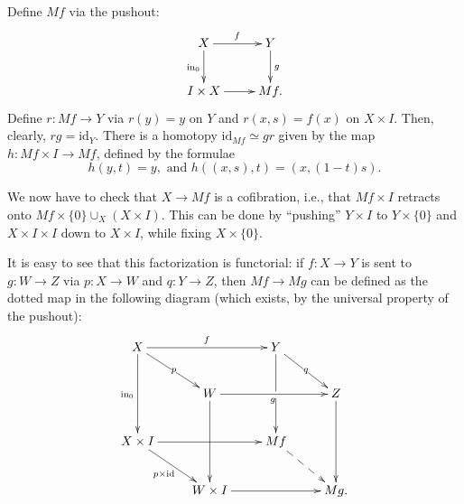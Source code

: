 \begin{solution}
    Define $Mf$ via the pushout:
    \begin{equation*}
	\xymatrix{
	    X\ar[r]^f \ar[d]_{\mathrm{in}_0} & Y\ar[d]^g\\
	    I\times X\ar[r] & Mf.
	    }
    \end{equation*}
    Define $r:Mf\to Y$ via $r(y) = y$ on $Y$ and $r(x,s) = f(x)$ on $X\times I$.
    Then, clearly, $rg = \mathrm{id}_Y$.
    There is a homotopy $\mathrm{id}_{Mf}\simeq gr$ given by the map $h:Mf\times I\to Mf$,
    defined by the formulae
    $$h(y,t) = y,\text{ and }h((x,s),t) = (x,(1-t)s).$$
    
    We now have to check that $X\to Mf$ is a cofibration, i.e., that
    $Mf\times I$ retracts onto $Mf\times\{0\}\cup_X (X\times I)$.
    This can be done by ``pushing'' $Y\times I$ to $Y\times\{0\}$ and $X\times I\times I$ down to $X\times I$,
    while fixing $X\times\{0\}$.
    
    It is easy to see that this factorization is functorial:
    if $f:X\to Y$ is sent to $g:W\to Z$ via $p:X\to W$ and $q:Y\to Z$,
    then $Mf\to Mg$ can be defined as the dotted map in the following diagram
    (which exists, by the universal property of the pushout):
    \begin{equation*}
	\xymatrix{
	    X\ar[rr]^f\ar[dd]_{\mathrm{in}_0}\ar[dr]|p & & Y\ar[dd]|\hole\ar[dr]|q & \\
	    & W\ar[rr]_g\ar[dd] & & Z\ar[dd]\\
	    X\times I\ar[rr]\ar[dr]_{p\times \mathrm{id}} & & Mf\ar@{-->}[dr] & \\
	    & W\times I\ar[rr] & & Mg.
	    }
    \end{equation*}
\end{solution}

